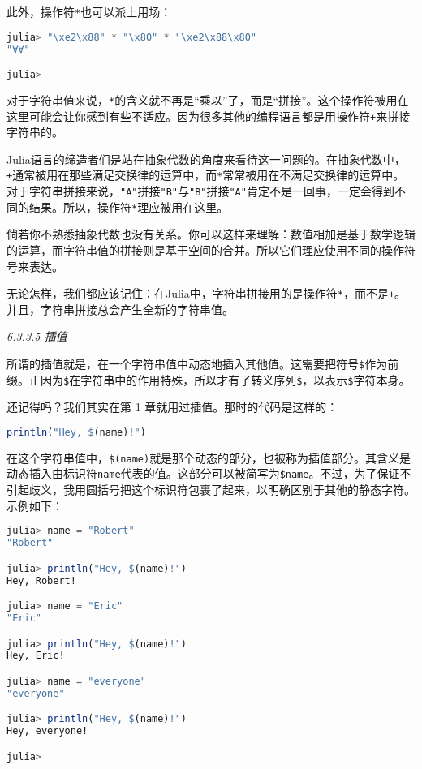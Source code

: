此外，操作符\verb|*|也可以派上用场：
\begin{lstlisting}[language=julia]
julia> "\xe2\x88" * "\x80" * "\xe2\x88\x80"
"∀∀"

julia> 
\end{lstlisting}

对于字符串值来说，\verb|*|的含义就不再是“乘以”了，而是“拼接”。这个操作符被用在这里可能会让你感到有些不适应。因为很多其他的编程语言都是用操作符\verb|+|来拼接字符串的。

Julia语言的缔造者们是站在抽象代数的角度来看待这一问题的。在抽象代数中，\verb|+|通常被用在那些满足交换律的运算中，而\verb|*|常常被用在不满足交换律的运算中。对于字符串拼接来说，\verb|"A"|拼接\verb|"B"|与\verb|"B"|拼接\verb|"A"|肯定不是一回事，一定会得到不同的结果。所以，操作符\verb|*|理应被用在这里。

倘若你不熟悉抽象代数也没有关系。你可以这样来理解：数值相加是基于数学逻辑的运算，而字符串值的拼接则是基于空间的合并。所以它们理应使用不同的操作符号来表达。

无论怎样，我们都应该记住：在Julia中，字符串拼接用的是操作符\verb|*|，而不是\verb|+|。并且，字符串拼接总会产生全新的字符串值。

\textsl{6.3.3.5 插值}

所谓的插值就是，在一个字符串值中动态地插入其他值。这需要把符号\verb|$|作为前缀。正因为\verb|$|在字符串中的作用特殊，所以才有了转义序列\verb|$|，以表示\verb|$|字符本身。

还记得吗？我们其实在第 1 章就用过插值。那时的代码是这样的：
\begin{lstlisting}[language=julia]
println("Hey, $(name)!")
\end{lstlisting}

在这个字符串值中，\verb|$(name)|就是那个动态的部分，也被称为插值部分。其含义是动态插入由标识符\verb|name|代表的值。这部分可以被简写为\verb|$name|。不过，为了保证不引起歧义，我用圆括号把这个标识符包裹了起来，以明确区别于其他的静态字符。示例如下：
\begin{lstlisting}[language=julia]
julia> name = "Robert"
"Robert"

julia> println("Hey, $(name)!")
Hey, Robert!

julia> name = "Eric"
"Eric"

julia> println("Hey, $(name)!")
Hey, Eric!

julia> name = "everyone"
"everyone"

julia> println("Hey, $(name)!")
Hey, everyone!

julia> 
\end{lstlisting}

